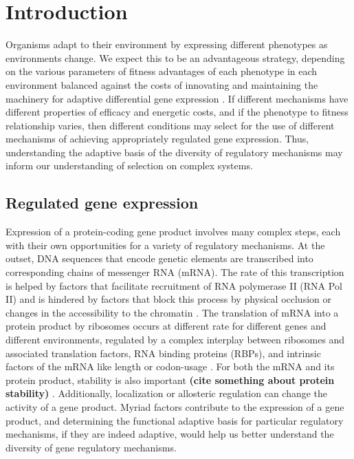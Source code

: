 \chapter{Introduction}

Organisms adapt to
their environment by expressing different phenotypes as environments
change. We expect this to be an advantageous strategy, depending on
the various parameters of fitness advantages of each phenotype in each
environment balanced against the costs of innovating and maintaining
the machinery for adaptive differential gene expression
\citep{kussell2005phenotypic}. 
If different mechanisms have different properties of
efficacy and energetic costs, and if the phenotype to fitness
relationship varies, then different conditions may select
for the use of different mechanisms of achieving appropriately
regulated gene expression.
Thus, understanding the adaptive basis of the diversity of 
regulatory mechanisms may inform our understanding of selection 
on complex systems.

\section{Regulated gene expression} 

Expression of a protein-coding gene
product involves many complex steps, each with their own opportunities
for a variety of regulatory mechanisms. At the outset, DNA sequences
that encode genetic elements are transcribed into corresponding chains
of messenger RNA (mRNA). The rate of this transcription is helped by
factors that facilitate recruitment of RNA polymerase II (RNA Pol II)
and is hindered by factors that block this process by physical
occlusion or changes in the accessibility to the chromatin 
\citep{hahn2011transcriptional}. 
The translation of mRNA into a protein product by
ribosomes occurs at different rate for different genes and different
environments, regulated by a complex interplay between ribosomes and
associated translation factors, RNA binding proteins (RBPs), and
intrinsic factors of the mRNA like length or codon-usage 
\citep{dever2016mechanism}. 
For both the mRNA and its protein product, stability is also
important 
\textbf{(cite something about protein stability)} 
\citep{perez2013eukaryotic}. 
Additionally, localization or allosteric regulation can change
the activity of a gene product. Myriad factors contribute to the
expression of a gene product, and determining the functional adaptive
basis for particular regulatory mechanisms, if they are indeed
adaptive, would help us better understand the diversity of gene
regulatory mechanisms.

